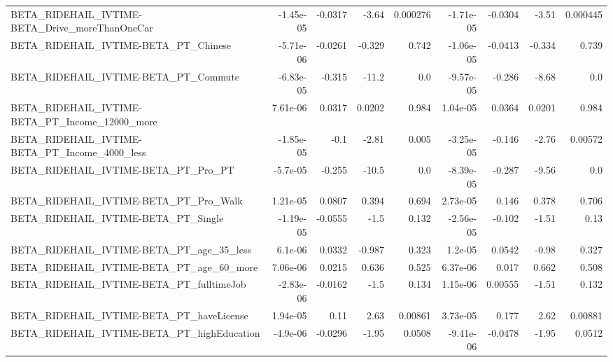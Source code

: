 \begin{tabular}{lrrrrrrrr}
BETA\_RIDEHAIL\_IVTIME-BETA\_Drive\_moreThanOneCar     &   -1.45e-05 &      -0.0317 &     -3.64 & 0.000276 &  -1.71e-05 &     -0.0304 &        -3.51 &      0.000445 \\
BETA\_RIDEHAIL\_IVTIME-BETA\_PT\_Chinese               &   -5.71e-06 &      -0.0261 &    -0.329 &    0.742 &  -1.06e-05 &     -0.0413 &       -0.334 &         0.739 \\
BETA\_RIDEHAIL\_IVTIME-BETA\_PT\_Commute               &   -6.83e-05 &       -0.315 &     -11.2 &      0.0 &  -9.57e-05 &      -0.286 &        -8.68 &           0.0 \\
BETA\_RIDEHAIL\_IVTIME-BETA\_PT\_Income\_12000\_more     &    7.61e-06 &       0.0317 &    0.0202 &    0.984 &   1.04e-05 &      0.0364 &       0.0201 &         0.984 \\
BETA\_RIDEHAIL\_IVTIME-BETA\_PT\_Income\_4000\_less      &   -1.85e-05 &         -0.1 &     -2.81 &    0.005 &  -3.25e-05 &      -0.146 &        -2.76 &       0.00572 \\
BETA\_RIDEHAIL\_IVTIME-BETA\_PT\_Pro\_PT                &    -5.7e-05 &       -0.255 &     -10.5 &      0.0 &  -8.39e-05 &      -0.287 &        -9.56 &           0.0 \\
BETA\_RIDEHAIL\_IVTIME-BETA\_PT\_Pro\_Walk              &    1.21e-05 &       0.0807 &     0.394 &    0.694 &   2.73e-05 &       0.146 &        0.378 &         0.706 \\
BETA\_RIDEHAIL\_IVTIME-BETA\_PT\_Single                &   -1.19e-05 &      -0.0555 &      -1.5 &    0.132 &  -2.56e-05 &      -0.102 &        -1.51 &          0.13 \\
BETA\_RIDEHAIL\_IVTIME-BETA\_PT\_age\_35\_less           &     6.1e-06 &       0.0332 &    -0.987 &    0.323 &    1.2e-05 &      0.0542 &        -0.98 &         0.327 \\
BETA\_RIDEHAIL\_IVTIME-BETA\_PT\_age\_60\_more           &    7.06e-06 &       0.0215 &     0.636 &    0.525 &   6.37e-06 &       0.017 &        0.662 &         0.508 \\
BETA\_RIDEHAIL\_IVTIME-BETA\_PT\_fulltimeJob           &   -2.83e-06 &      -0.0162 &      -1.5 &    0.134 &   1.15e-06 &     0.00555 &        -1.51 &         0.132 \\
BETA\_RIDEHAIL\_IVTIME-BETA\_PT\_haveLicense           &    1.94e-05 &         0.11 &      2.63 &  0.00861 &   3.73e-05 &       0.177 &         2.62 &       0.00881 \\
BETA\_RIDEHAIL\_IVTIME-BETA\_PT\_highEducation         &    -4.9e-06 &      -0.0296 &     -1.95 &   0.0508 &  -9.41e-06 &     -0.0478 &        -1.95 &        0.0512 \\

\end{tabular}
